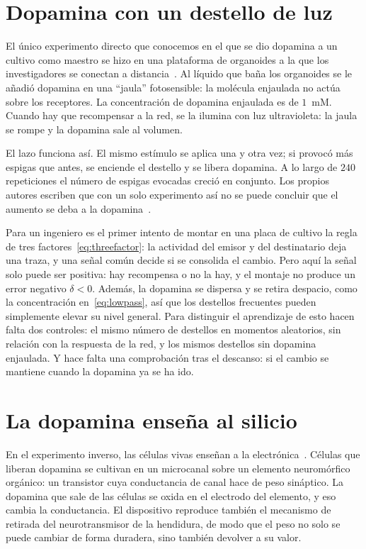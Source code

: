 \section{Dopamina con un destello de luz}
\label{sec:dishdopamine}

El único experimento directo que conocemos en el que se dio dopamina a un cultivo como maestro se hizo en una plataforma de organoides a la que los investigadores se conectan a distancia~\cite{Jordan2024}. Al líquido que baña los organoides se le añadió dopamina en una “jaula” fotosensible: la molécula enjaulada no actúa sobre los receptores. La concentración de dopamina enjaulada es de $1$~mM. Cuando hay que recompensar a la red, se la ilumina con luz ultravioleta: la jaula se rompe y la dopamina sale al volumen.

El lazo funciona así. El mismo estímulo se aplica una y otra vez; si provocó más espigas que antes, se enciende el destello y se libera dopamina. A lo largo de $240$ repeticiones el número de espigas evocadas creció en conjunto. Los propios autores escriben que con un solo experimento así no se puede concluir que el aumento se deba a la dopamina~\cite{Jordan2024}.

Para un ingeniero es el primer intento de montar en una placa de cultivo la regla de tres factores~\eqref{eq:threefactor}: la actividad del emisor y del destinatario deja una traza, y una señal común decide si se consolida el cambio. Pero aquí la señal solo puede ser positiva: hay recompensa o no la hay, y el montaje no produce un error negativo $\delta<0$. Además, la dopamina se dispersa y se retira despacio, como la concentración en~\eqref{eq:lowpass}, así que los destellos frecuentes pueden simplemente elevar su nivel general. Para distinguir el aprendizaje de esto hacen falta dos controles: el mismo número de destellos en momentos aleatorios, sin relación con la respuesta de la red, y los mismos destellos sin dopamina enjaulada. Y hace falta una comprobación tras el descanso: si el cambio se mantiene cuando la dopamina ya se ha ido.

\section{La dopamina enseña al silicio}
\label{sec:biohybrid}

En el experimento inverso, las células vivas enseñan a la electrónica~\cite{Keene2020}. Células que liberan dopamina se cultivan en un microcanal sobre un elemento neuromórfico orgánico: un transistor cuya conductancia de canal hace de peso sináptico. La dopamina que sale de las células se oxida en el electrodo del elemento, y eso cambia la conductancia. El dispositivo reproduce también el mecanismo de retirada del neurotransmisor de la hendidura, de modo que el peso no solo se puede cambiar de forma duradera, sino también devolver a su valor.

